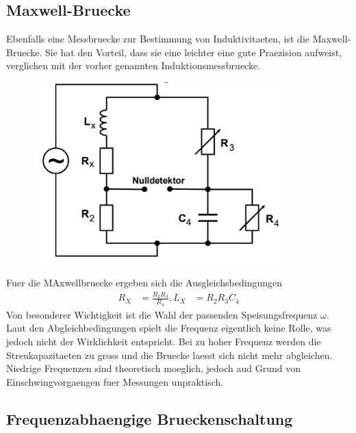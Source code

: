 \subsection{Maxwell-Bruecke}
Ebenfalls eine Messbruecke zur Bestimmung von Induktivitaeten, ist die Maxwell-Bruecke. Sie hat den Vorteil, dass sie eine leichter eine gute Praezision aufweist, verglichen mit der vorher genannten Induktionsmessbruecke.
\begin{figure}[H]
    \centering
    \captionsetup{justification=centering}
    \includegraphics[height=7cm]{"Maxwell_Brueckenschaltung.png"}
    \label{Fig:Maxwell}
\end{figure}
Fuer die MAxwellbruecke ergeben sich die Ausgleichsbedingungen 
\begin{align}
    R_X&=\frac{R_2R_3}{R_4},
    L_X&=R_2R_3C_4
\end{align}
Von besonderer Wichtigkeit ist die Wahl der passenden Speisungsfrequenz $\omega$. Laut den Abgleichbedingungen spielt die Frequenz eigentlich keine Rolle, was jedoch nicht der Wirklichkeit entspricht. Bei zu hoher Frequenz werden die Streukapazitaeten zu gross und die Bruecke laesst sich nicht mehr abgleichen. Niedrige Frequenzen sind theoretisch moeglich, jedoch aud Grund von Einschwingvorgaengen fuer Messungen unpraktisch.
\subsection{Frequenzabhaengige Brueckenschaltung}
